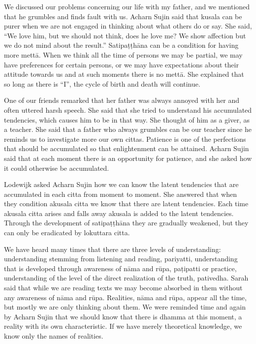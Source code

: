 We discussed our problems concerning our life with my father, and we mentioned that he grumbles and finds fault with us. Acharn Sujin said that kusala can be purer when we are not engaged in thinking about what others do or say. She said, ``We love him, but we should not think, does he love me? We show affection but we do not mind about the result.'' Satipaṭṭhāna can be a condition for having more mettā. When we think all the time of persons we may be partial, we may have preferences for certain persons, or we may have expectations about their attitude towards us and at such moments there is no mettā. She explained that so long as there is ``I'', the cycle of birth and death will continue.

One of our friends remarked that her father was always annoyed with her and often uttered harsh speech. She said that she tried to understand his accumulated tendencies, which causes him to be in that way. She thought of him as a giver, as a teacher. She said that a father who always grumbles can be our teacher since he reminds us to investigate more our own cittas. Patience is one of the perfections that should be accumulated so that enlightenment can be attained. Acharn Sujin said that at each moment there is an opportunity for patience, and she asked how it could otherwise be accumulated.

Lodewijk asked Acharn Sujin how we can know the latent tendencies that are accumulated in each citta from moment to moment. She answered that when they condition akusala citta we know that there are latent tendencies. Each time akusala citta arises and falls away akusala is added to the latent tendencies. Through the development of satipaṭṭhāna they are gradually weakened, but they can only be eradicated by lokuttara citta.

We have heard many times that there are three levels of understanding:
understanding stemming from listening and reading, pariyatti, understanding that is developed through awareness of nāma and rūpa, paṭipatti or practice,
understanding of the level of the direct realization of the truth, pativedha.
Sarah said that while we are reading texts we may become absorbed in them without any awareness of nāma and rūpa. Realities, nāma and rūpa, appear all the time, but mostly we are only thinking about them. We were reminded time and again by Acharn Sujin that we should know that there is dhamma at this moment, a reality with its own characteristic. If we have merely theoretical knowledge, we know only the names of realities.


